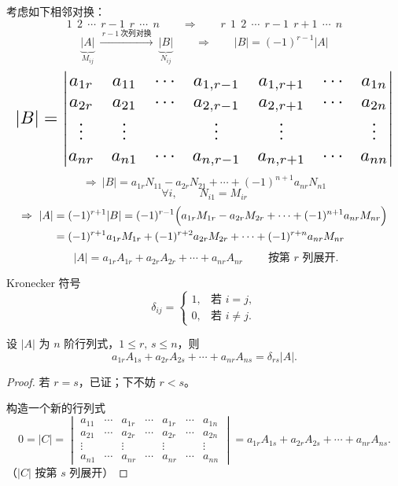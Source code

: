 考虑如下相邻对换：
\[
1\ \ 2\ \ \cdots\ \ r-1\ \ r\ \ \cdots\ \ n
\qquad\Rightarrow\qquad
r\ \ 1\ \ 2\ \ \cdots\ \ r-1\ \ r+1\ \ \cdots\ \ n
\]
\[
\underbrace{|A|}_{M_{ij}}
\ \xrightarrow{\ r-1\ \text{次列对换}\ }\
\underbrace{|B|}_{N_{ij}}
\qquad\Rightarrow\qquad
|B|=(-1)^{r-1}|A|
\]
\[
\resizebox{\linewidth}{!}{$\displaystyle
|B|=\begin{vmatrix}
a_{1r} & a_{11} & \cdots & a_{1,r-1} & a_{1,r+1} & \cdots & a_{1n}\\
a_{2r} & a_{21} & \cdots & a_{2,r-1} & a_{2,r+1} & \cdots & a_{2n}\\
\vdots & \vdots & & \vdots & \vdots & & \vdots\\
a_{nr} & a_{n1} & \cdots & a_{n,r-1} & a_{n,r+1} & \cdots & a_{nn}
\end{vmatrix}$}
\]
\[
\Rightarrow\ |B|=a_{1r}N_{11}-a_{2r}N_{21}+\cdots+(-1)^{n+1}a_{nr}N_{n1}
\]
\[
\forall i,\qquad N_{i1}=M_{ir}
\]
\begin{align*}
\Rightarrow\ |A|&=(-1)^{r+1}|B|=(-1)^{r-1}\Bigl(a_{1r}M_{1r}-a_{2r}M_{2r}+\cdots+(-1)^{n+1}a_{nr}M_{nr}\Bigr)\\
&=(-1)^{r+1}a_{1r}M_{1r}+(-1)^{r+2}a_{2r}M_{2r}+\cdots+(-1)^{r+n}a_{nr}M_{nr}
\end{align*}
\[
\boxed{\;|A|=a_{1r}A_{1r}+a_{2r}A_{2r}+\cdots+a_{nr}A_{nr}\;}
\qquad\text{按第 } r \text{ 列展开}.
\]

Kronecker 符号
\[
\delta_{ij}=
\begin{cases}
1, & \text{若 } i=j,\\
0, & \text{若 } i\neq j.
\end{cases}
\]

\begin{theorem}%
设 $|A|$ 为 $n$ 阶行列式，$1\le r,\,s\le n$，则
\[
a_{1r}A_{1s}+a_{2r}A_{2s}+\cdots+a_{nr}A_{ns}=\delta_{rs}|A|.
\]
\end{theorem}

\begin{proof}
若 $r=s$，已证；下不妨 $r<s$。

构造一个新的行列式
\[
0=|C|=\begin{vmatrix}
a_{11} & \cdots & a_{1r} & \cdots & a_{1r} & \cdots & a_{1n}\\
a_{21} & \cdots & a_{2r} & \cdots & a_{2r} & \cdots & a_{2n}\\
\vdots & & \vdots & & \vdots & & \vdots\\
a_{n1} & \cdots & a_{nr} & \cdots & a_{nr} & \cdots & a_{nn}
\end{vmatrix}
=a_{1r}A_{1s}+a_{2r}A_{2s}+\cdots+a_{nr}A_{ns}.
\]
（$|C|$ 按第 $s$ 列展开）
\end{proof}

